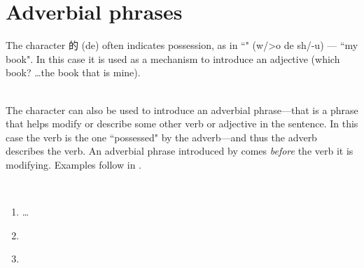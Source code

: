 \section{Adverbial phrases}
%
\hfill%
\begin{minipage}{\tw-30mm}%
  The character 的 (de) often indicates possession,
  as in ``" (w/>o de sh/-u) --- ``my book".
  In this case it is used as a mechanism to introduce an adjective
  (which book? \ldots the book that is mine).
\end{minipage}
\\
The character  can also be used to introduce an adverbial phrase---that 
is a phrase that helps modify or describe some other verb or adjective in
the sentence.
In this case the verb is the one ``possessed" by the adverb---and thus the adverb describes the verb.
An adverbial phrase introduced by  comes {\em before} the verb it is modifying.
Examples follow in .

\begin{example}
\mbox{}\\
\label{ex:adv_phrases_de}
\begin{enumerate}
  \item \ldots
        \zhtsP

  \item {}
        \zhtsP

  \item {}%
        \zhtsP
        \\
\end{enumerate}
\end{example}

